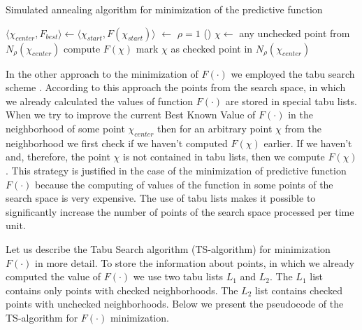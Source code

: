 \documentclass[runningheads,a4paper]{llncs}
\begin{document}
\begin{algorithm}[htb]
 \DontPrintSemicolon
 \caption{Simulated annealing algorithm for minimization of the predictive function}
	$\langle \chi_{center}, F_{best} \rangle \gets \langle \chi_{start}, F(\chi_{start}) \rangle$\;
	 {
		\bestValueUpdated $\gets$ \false\;
		$\rho = 1$\;
		\Repeat(){\bestValueUpdated}{
			$\chi \gets$ any unchecked  point from $N_{\rho}(\chi_{center})$ \;
			compute $F(\chi)$\;
			mark $\chi$ as checked point in $N_{\rho}(\chi_{center})$\;
			\decreaseTemperature{}\;
		}
	}
\;
\end{algorithm}

In the other approach to the minimization of $F(\cdot)$ we employed the tabu search scheme \cite{Glover:1997:TS:549765}. According to this approach the points from the search space, in which we already calculated the values of function $F(\cdot)$ are stored in special tabu lists. When we try to improve the current Best Known Value of $F(\cdot)$ in the neighborhood of some point $\chi_{center}$ then for an arbitrary point $\chi$ from the neighborhood we first check if we haven’t computed $F(\chi)$ earlier. If we haven’t and, therefore, the point $\chi$ is not contained in tabu lists, then we compute $F(\chi)$. This strategy is justified in the case of the minimization of predictive function $F(\cdot)$ because the computing of values of the function in some points of the search space is very expensive. The use of tabu lists makes it possible to significantly increase the number of points of the search space processed per time unit.

Let us describe the Tabu Search algorithm (TS-algorithm) for minimization $F(\cdot)$ in more detail. To store the information about points, in which we already computed the value of $F(\cdot)$ we use two tabu lists $L_1$ and $L_2$. The $L_1$ list contains only points with checked neighborhoods. The $L_2$ list contains checked points with unchecked neighborhoods. Below we present the pseudocode of the TS-algorithm for $F(\cdot)$ minimization. 
\end{document}
